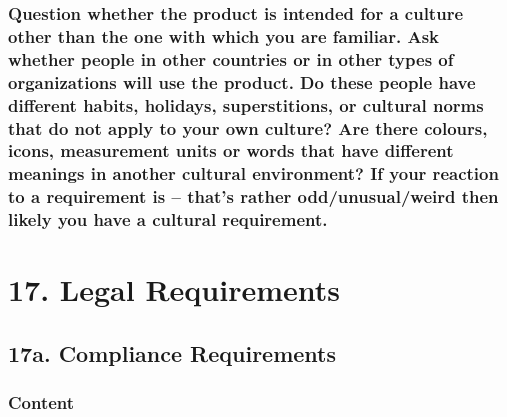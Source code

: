 \documentclass[
]{article}
\begin{document}
\hypertarget{question-whether-the-product-is-intended-for-a-culture-other-than-the-one-with-which-you-are-familiar.-ask-whether-people-in-other-countries-or-in-other-types-of-organizations-will-use-the-product.-do-these-people-have-different-habits-holidays-superstitions-or-cultural-norms-that-do-not-apply-to-your-own-culture-are-there-colours-icons-measurement-units-or-words-that-have-different-meanings-in-another-cultural-environment-if-your-reaction-to-a-requirement-is-thats-rather-oddunusualweird-then-likely-you-have-a-cultural-requirement.}{%
\subsubsection{Question whether the product is intended for a culture
other than the one with which you are familiar. Ask whether people in
other countries or in other types of organizations will use the product.
Do these people have different habits, holidays, superstitions, or
cultural norms that do not apply to your own culture? Are there colours,
icons, measurement units or words that have different meanings in
another cultural environment? If your reaction to a requirement is --
that's rather odd/unusual/weird then likely you have a cultural
requirement.}\label{question-whether-the-product-is-intended-for-a-culture-other-than-the-one-with-which-you-are-familiar.-ask-whether-people-in-other-countries-or-in-other-types-of-organizations-will-use-the-product.-do-these-people-have-different-habits-holidays-superstitions-or-cultural-norms-that-do-not-apply-to-your-own-culture-are-there-colours-icons-measurement-units-or-words-that-have-different-meanings-in-another-cultural-environment-if-your-reaction-to-a-requirement-is-thats-rather-oddunusualweird-then-likely-you-have-a-cultural-requirement.}}

\hypertarget{legal-requirements}{%
\section{\texorpdfstring{17. Legal Requirements
}{17. Legal Requirements }}\label{legal-requirements}}

\hypertarget{a.-compliance-requirements}{%
\subsection{17a. Compliance
Requirements}\label{a.-compliance-requirements}}

\hypertarget{content-58}{%
\subsubsection{Content}\label{content-58}}
\end{document}
